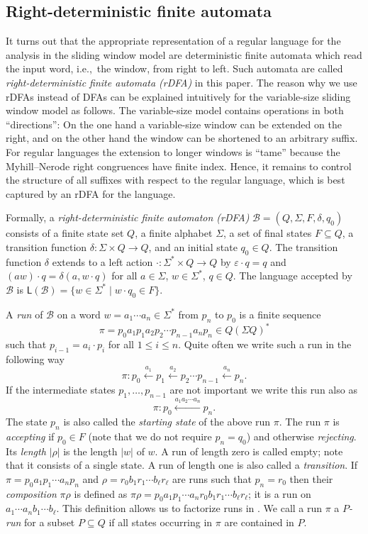 \documentclass{article}\usepackage[a4paper,margin=20mm]{geometry}
\newcommand{\B}{\mathcal{B}}
\renewcommand{\L}{\mathsf{L}}
\newcommand{\eps}{\varepsilon}
\renewcommand{\leq}{\leqslant}
\renewcommand{\le}{\leq}
\begin{document}
\subsection{Right-deterministic finite automata}

It turns out that the appropriate representation of a regular language
for the analysis in the sliding window model are
deterministic finite automata which read the input word, i.e.,~the window, from right to left.
Such automata are called {\em right-deterministic finite automata (rDFA)} in this paper.
The reason why we use rDFAs instead of DFAs can be explained intuitively
for the variable-size sliding window model as follows.
The variable-size model contains operations in both ``directions'':
On the one hand a variable-size window can be extended on the right, and on the other hand the window can be shortened to an arbitrary suffix.
For regular languages the extension to longer windows is ``tame''
because the Myhill--Nerode right congruences have finite index.
Hence, it remains to control the structure of all suffixes with respect to the regular language,
which is best captured by an rDFA for the language.


Formally, a {\em right-deterministic finite automaton (rDFA)} $\B = (Q,\Sigma,F,\delta,q_0)$
consists of a finite state set $Q$, a finite alphabet $\Sigma$,
a set of final states $F \subseteq Q$, a transition function $\delta \colon \Sigma \times Q \to Q$,
and an initial state $q_0 \in Q$.
The transition function $\delta$ extends to a left action $\cdot \colon \Sigma^* \times Q \to Q$
by $\eps \cdot q = q$ and $(aw) \cdot q = \delta(a,w \cdot q)$ for all $a \in \Sigma$,
$w \in \Sigma^*$, $q \in Q$. The language accepted by $\B$ is
$\L(\B) = \{ w \in \Sigma^* \mid w \cdot q_0 \in F \}$.

A {\em run} of $\B$ on a word $w = a_1 \cdots a_n \in \Sigma^*$
from $p_n$ to $p_0$ is a finite sequence
\[ \pi = p_0 a_1 p_1 a_2 p_2 \cdots p_{n-1} a_n p_n \in Q (\Sigma Q)^* \]
such that $p_{i-1} = a_i \cdot p_i$ for all $1 \le i \le n$.
Quite often we write such a run in the following way
\[
\pi : p_0 \xleftarrow{a_1} p_1 \xleftarrow{a_2} p_2 \cdots p_{n-1} \xleftarrow{a_n} p_n .
\]
If the intermediate states $p_1,\ldots, p_{n-1}$ are not important we write this run also as
\[
\pi : p_0 \xleftarrow{a_1 a_2 \cdots a_n} p_n .
\]
The state $p_n$ is also called the \emph{starting state} of the above run $\pi$.
The run $\pi$ is {\em accepting} if $p_0 \in F$ (note that we do not require $p_n = q_0$) and otherwise {\em rejecting}.
Its {\em length} $|\rho|$ is the length $|w|$ of $w$. A run of length zero is called empty;
note that it consists of a single state. A run of length one is also called a {\em transition}.
If $\pi = p_0 a_1 p_1 \cdots a_n p_n$
and $\rho = r_0 b_1 r_1 \cdots b_\ell r_\ell $ are runs such that $p_n = r_0$
then their {\em composition} $\pi \rho$ is defined as
$\pi \rho = p_0 a_1 p_1 \cdots a_n r_0 b_1 r_1 \cdots b_\ell r_\ell$; it is a run on $a_1 \cdots a_n b_1 \cdots b_\ell$.
This definition allows
us to factorize runs in .
We call a run $\pi$ a {\em $P$-run} for a subset $P \subseteq Q$
if all states occurring in $\pi$ are contained in $P$.
\end{document}
